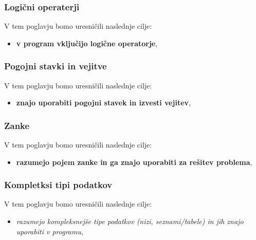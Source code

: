 \subsubsection{Logični operaterji}
\label{sec:logicni_peraterji}

V tem poglavju bomo uresničili naslednje cilje:
\begin{itemize}
\tightlist
\item \textbf{v program vključijo logične operatorje},
\end{itemize}

\subsubsection{Pogojni stavki in vejitve}
\label{sec:pogojni_stavki_vejitve}

V tem poglavju bomo uresničili naslednje cilje:
\begin{itemize}
\item \textbf{znajo uporabiti pogojni stavek in izvesti
    vejitev},
\end{itemize}

\subsubsection{Zanke}
\label{sec:zanke}

V tem poglavju bomo uresničili naslednje cilje:
\begin{itemize}
\item \textbf{razumejo pojem zanke in ga znajo uporabiti za rešitev
    problema},
\end{itemize}

\subsubsection{Kompletksi tipi podatkov}
\label{sec:kompleksni_tipi_podatkov}

V tem poglavju bomo uresničili naslednje cilje:
\begin{itemize}
\item \emph{razumejo kompleksnejše tipe podatkov (nizi,
    seznami/tabele) in jih znajo uporabiti v programu},
\end{itemize}



